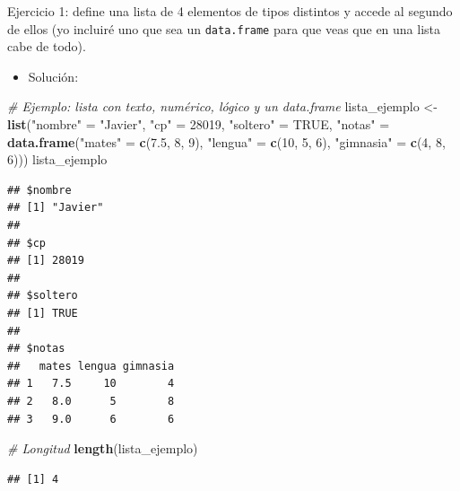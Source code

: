 \documentclass[11pt,]{book}
\newenvironment{Shaded}{\begin{snugshade}}{\end{snugshade}}
\newcommand{\CommentTok}[1]{\textcolor[rgb]{0.37,0.37,0.37}{\textit{#1}}}
\newcommand{\DecValTok}[1]{\textcolor[rgb]{0.06,0.06,0.06}{#1}}
\newcommand{\FloatTok}[1]{\textcolor[rgb]{0.06,0.06,0.06}{#1}}
\newcommand{\KeywordTok}[1]{\textcolor[rgb]{0.27,0.27,0.27}{\textbf{#1}}}
\newcommand{\NormalTok}[1]{#1}
\newcommand{\OtherTok}[1]{\textcolor[rgb]{0.37,0.37,0.37}{#1}}
\newcommand{\StringTok}[1]{\textcolor[rgb]{0.5,0.5,0.5}{#1}}
\providecommand{\tightlist}{%
  \setlength{\itemsep}{0pt}\setlength{\parskip}{0pt}}
\begin{document}
Ejercicio 1: define una lista de 4 elementos de tipos distintos y accede al segundo de ellos (yo incluiré uno que sea un \texttt{data.frame} para que veas que en una lista cabe de todo).

\begin{itemize}
\tightlist
\item
  Solución:
\end{itemize}

\begin{Shaded}
\begin{Highlighting}[]
\CommentTok{# Ejemplo: lista con texto, numérico, lógico y un data.frame}
\NormalTok{lista_ejemplo <-}\StringTok{ }\KeywordTok{list}\NormalTok{(}\StringTok{"nombre"}\NormalTok{ =}\StringTok{ "Javier"}\NormalTok{, }\StringTok{"cp"}\NormalTok{ =}\StringTok{ }\DecValTok{28019}\NormalTok{,}
                      \StringTok{"soltero"}\NormalTok{ =}\StringTok{ }\OtherTok{TRUE}\NormalTok{,}
                      \StringTok{"notas"}\NormalTok{ =}\StringTok{ }\KeywordTok{data.frame}\NormalTok{(}\StringTok{"mates"}\NormalTok{ =}\StringTok{ }\KeywordTok{c}\NormalTok{(}\FloatTok{7.5}\NormalTok{, }\DecValTok{8}\NormalTok{, }\DecValTok{9}\NormalTok{),}
                                           \StringTok{"lengua"}\NormalTok{ =}\StringTok{ }\KeywordTok{c}\NormalTok{(}\DecValTok{10}\NormalTok{, }\DecValTok{5}\NormalTok{, }\DecValTok{6}\NormalTok{),}
                                           \StringTok{"gimnasia"}\NormalTok{ =}\StringTok{ }\KeywordTok{c}\NormalTok{(}\DecValTok{4}\NormalTok{, }\DecValTok{8}\NormalTok{, }\DecValTok{6}\NormalTok{)))}
\NormalTok{lista_ejemplo}
\end{Highlighting}
\end{Shaded}

\begin{verbatim}
## $nombre
## [1] "Javier"
## 
## $cp
## [1] 28019
## 
## $soltero
## [1] TRUE
## 
## $notas
##   mates lengua gimnasia
## 1   7.5     10        4
## 2   8.0      5        8
## 3   9.0      6        6
\end{verbatim}

\begin{Shaded}
\begin{Highlighting}[]
\CommentTok{# Longitud}
\KeywordTok{length}\NormalTok{(lista_ejemplo)}
\end{Highlighting}
\end{Shaded}

\begin{verbatim}
## [1] 4
\end{verbatim}
\end{document}

